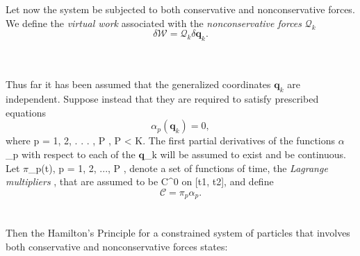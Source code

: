 \\\\
Let now the system be subjected to both conservative and nonconservative forces. We define the \emph{virtual work} associated with the \emph{nonconservative forces} $\mathcal{Q}_k$  
\[ \delta\mathcal{W}=\mathcal{Q}_k\delta\mathbf{q}_k.\]
\\\\
\par
Thus far it has been assumed that the generalized coordinates $\mathbf{q}_k$ are independent. Suppose instead that they are required to satisfy prescribed equations 
\[ \alpha_p(\mathbf{q}_k)=0, \] 
where p = 1, 2, . . . , P , P < K. The first partial derivatives of the functions $\alpha$_p with respect to each of the $\mathbf{q}$_k will be assumed to exist and be continuous.
\\Let $\pi$_p(t), p = 1, 2, ..., P , denote a set of functions of time, the \emph{Lagrange multipliers} , that are assumed to be C^0 on [t1, t2], and define
\[ \mathcal{C} = \pi_p\alpha_p.\]
\\\\
Then the Hamilton's Principle for a constrained system of particles that involves both conservative and nonconservative forces states:


\emph{}






  
  
  
  
  
  
  
  
  
  
  
  
  
  
  
  
  
  
  
  
  
  